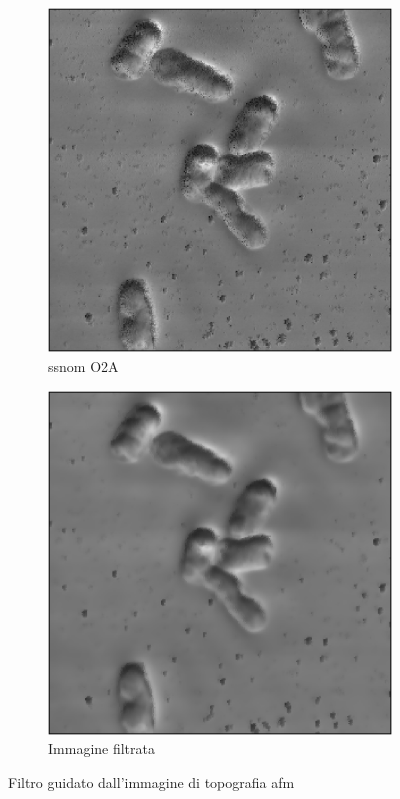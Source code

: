 \documentclass[../main.tex]{subfiles}
\begin{document}
\begin{figure}[ht]
\begin{subfigure}{0.32\linewidth}
		\includegraphics[keepaspectratio, width=\linewidth]{images/entero_o2a.png}
		\caption{\acrshort{ssnom} O2A}
	\end{subfigure}
	\begin{subfigure}{0.32\linewidth}
		\includegraphics[keepaspectratio, width=\linewidth]{images/entero_guided.png}
		\caption{Immagine filtrata}
	\end{subfigure}
	\caption[Filtro guidato dall'immagine di topografia AFM]{
		Filtro guidato dall'immagine di topografia \acrshort{afm}}
\end{figure}
\end{document}
